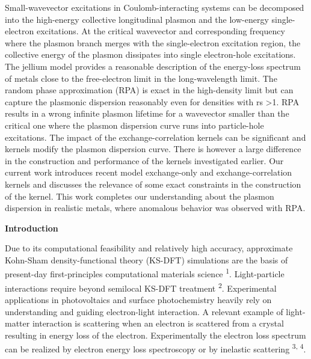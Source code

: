 \documentclass[12pt]{article}
\renewcommand{\_}{\kern-1.5pt\textunderscore\kern-1.5pt}
\begin{document}
\vspace{\baselineskip}
\setlength{\parskip}{9.96pt}
\setlength{\parskip}{0.0pt}
\begin{justify}
 Small-wavevector excitations in Coulomb-interacting systems can be decomposed into the high-energy collective longitudinal plasmon and the low-energy single-electron excitations. At the critical wavevector and corresponding frequency where the plasmon branch merges with the single-electron excitation region, the collective energy of the plasmon dissipates into single electron-hole excitations. The jellium model provides a reasonable description of the energy-loss spectrum of metals close to the free-electron limit in the long-wavelength limit. The random phase approximation (RPA) is exact in the high-density limit but can capture the plasmonic dispersion reasonably even for densities with rs >1. RPA results in a wrong infinite plasmon lifetime for a wavevector smaller than the critical one where the plasmon dispersion curve runs into particle-hole excitations. The impact of the exchange-correlation kernels can be significant and kernels modify the plasmon dispersion curve. There is however a large difference in the construction and performance of the kernels investigated earlier. Our current work introduces recent model exchange-only and exchange-correlation kernels and discusses the relevance of some exact constraints in the construction of the kernel. This work completes our understanding about the plasmon dispersion in realistic metals, where anomalous behavior was observed with RPA. 
\end{justify}\par


\vspace{\baselineskip}
\setlength{\parskip}{9.96pt}
\setlength{\parskip}{0.0pt}
\begin{justify}
\textbf{Introduction}
\end{justify}\par


\vspace{\baselineskip}
\setlength{\parskip}{9.96pt}
\setlength{\parskip}{0.0pt}
\begin{justify}
Due to its computational feasibility and relatively high accuracy, approximate Kohn-Sham density-functional theory (KS-DFT) simulations are the basis of present-day first-principles computational materials science \textsuperscript{1}. Light-particle interactions require beyond semilocal KS-DFT treatment \textsuperscript{2}. Experimental applications in photovoltaics and surface photochemistry heavily rely on understanding and guiding electron-light interaction. A relevant example of light-matter interaction is scattering when an electron is scattered from a crystal resulting in energy loss of the electron. Experimentally the electron loss spectrum can be realized by electron energy loss spectroscopy or by inelastic scattering \textsuperscript{3, 4}. 
\end{justify}\par
\end{document}
